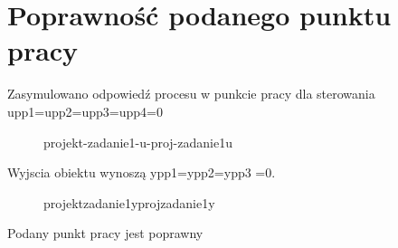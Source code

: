 \section{Poprawność podanego punktu pracy}
\label{projekt:zad1}

Zasymulowano	odpowiedź	procesu	w	punkcie	pracy	dla	sterowania	
upp1=upp2=upp3=upp4=0	

\ifdefined\CompileFigures
   \begin{figure}[H] 
      \centering
      
      \caption{projekt-zadanie1-u-proj-zadanie1u}
      \label{projekt:zad1:figure:proj_zadanie1u}
   \end{figure}
\fi

Wyjscia obiektu	wynoszą	ypp1=ypp2=ypp3	=0.

\ifdefined\CompileFigures
   \begin{figure}[H] 
      \centering
      
      \caption{projektzadanie1yprojzadanie1y}
      \label{projekt:zad1:figure:proj_zadanie1y}
   \end{figure}
\fi

Podany	punkt	pracy	jest	poprawny

\newpage
